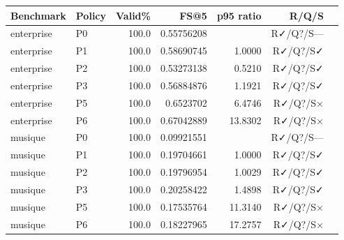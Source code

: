 \begin{tabular}{llrrrrl}
Benchmark & Policy & Valid\% & FS@5 & p95 ratio & R/Q/S \\ \hline
enterprise & P0 & 100.0 & 0.55756208 &  & R✓/Q?/S— \\ 
enterprise & P1 & 100.0 & 0.58690745 & 1.0000 & R✓/Q?/S✓ \\ 
enterprise & P2 & 100.0 & 0.53273138 & 0.5210 & R✓/Q?/S✓ \\ 
enterprise & P3 & 100.0 & 0.56884876 & 1.1921 & R✓/Q?/S✓ \\ 
enterprise & P5 & 100.0 & 0.6523702 & 6.4746 & R✓/Q?/S× \\ 
enterprise & P6 & 100.0 & 0.67042889 & 13.8302 & R✓/Q?/S× \\ 
musique & P0 & 100.0 & 0.09921551 &  & R✓/Q?/S— \\ 
musique & P1 & 100.0 & 0.19704661 & 1.0000 & R✓/Q?/S✓ \\ 
musique & P2 & 100.0 & 0.19796954 & 1.0029 & R✓/Q?/S✓ \\ 
musique & P3 & 100.0 & 0.20258422 & 1.4898 & R✓/Q?/S✓ \\ 
musique & P5 & 100.0 & 0.17535764 & 11.3140 & R✓/Q?/S× \\ 
musique & P6 & 100.0 & 0.18227965 & 17.2757 & R✓/Q?/S× \\ 
\end{tabular}
